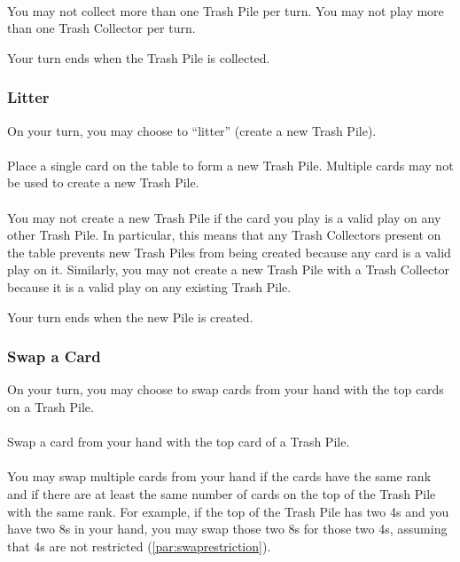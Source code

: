 \documentclass{article}
\begin{document}
\paragraph{} \label{par:collectsingle}
You may not collect more than one Trash Pile per turn. You may not play more than one Trash Collector per turn.

Your turn ends when the Trash Pile is collected.

\subsubsection{Litter}
\label{sec:litter}

On your turn, you may choose to ``litter'' (create a new Trash Pile).

\paragraph{} \label{par:littercreate}
Place a single card on the table to form a new Trash Pile. Multiple cards may not be used to create a new Trash Pile.

\paragraph{} \label{par:litterrestriction}
You may not create a new Trash Pile if the card you play is a valid play on any other Trash Pile. In particular, this means that any Trash Collectors present on the table prevents new Trash Piles from being created because any card is a valid play on it. Similarly, you may not create a new Trash Pile with a Trash Collector because it is a valid play on any existing Trash Pile.

Your turn ends when the new Pile is created.

\newpage
\subsubsection{Swap a Card}
\label{sec:swap}

On your turn, you may choose to swap cards from your hand with the top cards on a Trash Pile.

\paragraph{} \label{par:swaptop}
Swap a card from your hand with the top card of a Trash Pile.

\paragraph{} \label{par:swapmultiple}
You may swap multiple cards from your hand if the cards have the same rank and if there are at least the same number of cards on the top of the Trash Pile with the same rank. For example, if the top of the Trash Pile has two 4s and you have two 8s in your hand, you may swap those two 8s for those two 4s, assuming that 4s are not restricted (\autoref{par:swaprestriction}).
\end{document}
